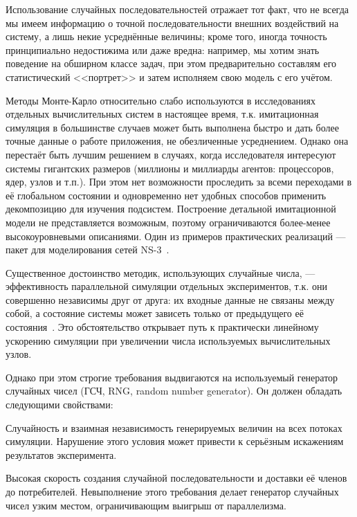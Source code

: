 Использование случайных последовательностей отражает тот факт, что не всегда мы имеем информацию о точной последовательности внешних воздействий на систему, а лишь некие усреднённые величины; кроме того, иногда точность принципиально недостижима или даже вредна: например, мы хотим знать поведение на обширном классе задач, при этом предварительно составлям его статистический <<портрет>> и затем исполняем свою модель с его учётом. 

Методы Монте-Карло относительно слабо используются в исследованиях отдельных вычислительных систем в настоящее время, т.к. имитационная симуляция в большинстве случаев может быть выполнена быстро и дать более точные данные о работе приложения, не обезличенные усреднением. Однако она перестаёт быть лучшим решением в случаях, когда исследователя интересуют системы гигантских размеров (миллионы и миллиарды агентов: процессоров, ядер, узлов и т.п.). При этом нет возможности проследить за всеми переходами в её глобальном состоянии и одновременно нет удобных способов применить декомпозицию для изучения подсистем. Построение детальной имитационной модели не представляется возможным, поэтому ограничиваются более-менее высокоуровневыми описаниями. Один из примеров практических реализаций — пакет для моделирования сетей NS-3~\cite{ns}.

Существенное достоинство методик, использующих случайные числа, — эффективность параллельной симуляции отдельных экспериментов, т.к. они совершенно независимы друг от друга: их входные данные не связаны между собой, а состояние системы может зависеть только от предыдущего её состояния~\cite{glinsky2011}. Это обстоятельство открывает путь к практически линейному ускорению симуляции при увеличении числа используемых вычислительных узлов.

Однако при этом строгие требования  выдвигаются на используемый генератор случайных чисел (ГСЧ, \abbr RNG, random number generator). Он должен обладать следующими свойствами:
\begin{enumerate*}
\item Случайность и взаимная независимость генерируемых величин на всех потоках симуляции. Нарушение этого условия может привести к серьёзным искажениям результатов эксперимента.
\item Высокая скорость создания случайной последовательности и доставки её членов до потребителей. Невыполнение этого требования делает генератор случайных чисел узким местом, ограничивающим выигрыш от параллелизма.
\end{enumerate*}

